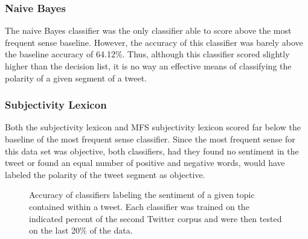 \documentclass[11pt]{article}
\begin{document}
\subsubsection*{Naive Bayes}
The naive Bayes classifier was the only classifier able to score above the most frequent sense baseline. However, the accuracy of this classifier was barely above the baseline accuracy of 64.12\%. Thus, although this classifier scored slightly higher than the decision list, it is no way an effective means of classifying the polarity of a given segment of a tweet.

\subsubsection*{Subjectivity Lexicon}
Both the subjectivity lexicon and MFS subjectivity lexicon scored far below the baseline of the most frequent sense classifier. Since the most frequent sense for this data set was objective, both classifiers, had they found no sentiment in the tweet or found an equal number of positive and negative words, would have labeled the polarity of the tweet segment as objective. 

\begin{figure}[htb!]
  \centering
  \caption{Accuracy of classifiers labeling the sentiment of a given topic contained within a tweet. Each classifier was trained on the indicated percent of the second Twitter corpus and were then tested on the last 20\% of the data.}
\end{figure}
\end{document}
